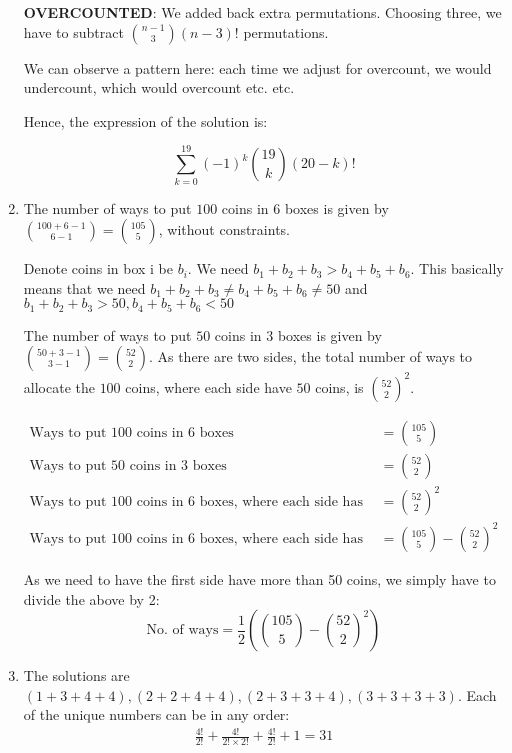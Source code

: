 \documentclass{article}
\begin{document}
\begin{enumerate}[label=(\alph*)]
          \textbf{OVERCOUNTED}: We added back extra permutations. Choosing three, we have to subtract $\binom{n-1}{3}(n-3)!$ permutations.

          We can observe a pattern here: each time we adjust for overcount, we would undercount, which would overcount etc. etc.

          Hence, the expression of the solution is:

          \[
              \sum_{k=0}^{19}(-1)^k\binom{19}k(20-k)!
          \]

    \item The number of ways to put $100$ coins in $6$ boxes is given by $\binom{100+6-1}{6-1} = \binom{105}{5}$, without constraints.

          Denote coins in box i be $b_i$. We need $b_1+b_2+b_3 > b_4+b_5+b_6$. This basically means that we need $b_1+b_2+b_3 \neq b_4+b_5+b_6 \neq 50$ and $b_1+b_2+b_3 > 50, b_4+b_5+b_6 < 50$

          The number of ways to put $50$ coins in $3$ boxes is given by $\binom{50+3-1}{3-1} = \binom{52}{2}$. As there are two sides, the total number of ways to allocate the $100$ coins, where each side have $50$ coins, is $\binom{52}{2}^2$.

          \begin{align*}
              \text{Ways to put 100 coins in 6 boxes}                                         & = \binom{105}{5}                   \\
              \text{Ways to put 50 coins in 3 boxes}                                          & = \binom{52}{2}                    \\
              \text{Ways to put 100 coins in 6 boxes, where each side has 50 coins}           & = \binom{52}{2}^2                  \\
              \text{Ways to put 100 coins in 6 boxes, where each side has more than 50 coins} & = \binom{105}{5} - \binom{52}{2}^2
          \end{align*}

          As we need to have the first side have more than 50 coins, we simply have to divide the above by 2:
          \[
              \text{No. of ways}=\frac{1}{2} \left( \binom{105}{5} - \binom{52}{2}^2 \right)
          \]

    \item The solutions are $(1+3+4+4), (2+2+4+4), (2+3+3+4), (3+3+3+3)$. Each of the unique numbers can be in any order:
          \begin{align*}
              \frac{4!}{2!} + \frac{4!}{2! \times 2!} + \frac{4!}{2!} + 1 = 31
          \end{align*}
\end{enumerate}
\end{document}
